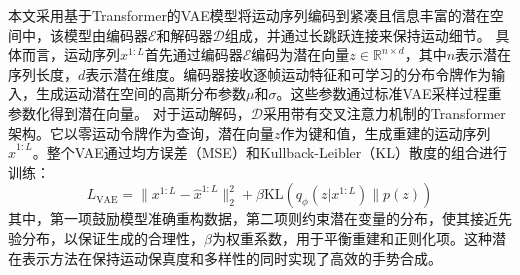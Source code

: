 本文采用基于Transformer的VAE模型将运动序列编码到紧凑且信息丰富的潜在空间中，该模型由编码器$\mathcal{E}$和解码器$\mathcal{D}$组成，并通过长跳跃连接来保持运动细节。
具体而言，运动序列$x^{1:L}$首先通过编码器$\mathcal{E}$编码为潜在向量$z \in \mathbb{R}^{n\times d}$，其中$n$表示潜在序列长度，$d$表示潜在维度。编码器接收逐帧运动特征和可学习的分布令牌作为输入，生成运动潜在空间的高斯分布参数$\mu$和$\sigma$。这些参数通过标准VAE采样过程重参数化得到潜在向量。
对于运动解码，$\mathcal{D}$采用带有交叉注意力机制的Transformer架构。它以零运动令牌作为查询，潜在向量$z$作为键和值，生成重建的运动序列$\hat{x}^{1:L}$。整个VAE通过均方误差（MSE）和Kullback-Leibler（KL）散度的组合进行训练：
\begin{equation}
L_{\text{VAE}} = \|x^{1:L} - \hat{x}^{1:L}\|_2^2 + \beta \text{KL}(q_{\phi}(z|x^{1:L})\|p(z))
\label{eq:loss_vae}
\end{equation}
其中，第一项鼓励模型准确重构数据，第二项则约束潜在变量的分布，使其接近先验分布，以保证生成的合理性，$\beta$为权重系数，用于平衡重建和正则化项。这种潜在表示方法在保持运动保真度和多样性的同时实现了高效的手势合成。

